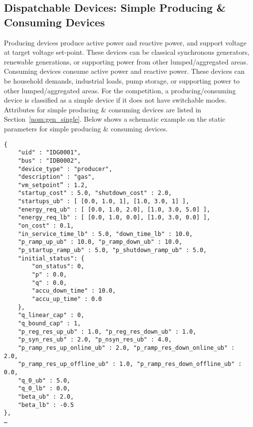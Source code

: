 \subsection{Dispatchable Devices: Simple Producing \& Consuming Devices}
\label{sec:generator}
Producing devices
produce active power and reactive power, and support voltage at target voltage set-point.
These devices can be classical synchronous generators, renewable generations, or supporting 
power from other lumped/aggregated areas. 
Consuming devices consume active power and reactive power.
These devices can be household demands, industrial loads, pump storage, or
supporting power to other lumped/aggregated areas. 
For the competition, a producing/consuming device is classified as a simple device if it
does not have switchable modes.
Attributes for simple producing \& consuming devices are listed in Section~\ref{nom:gen_single}.
Below shows a schematic example on the static parameters for simple producing \& consuming devices.

\begin{verbatim}
{
    "uid" : "IDG0001",
    "bus" : "IDB0002",
    "device_type" : "producer",
    "description" : "gas",
    "vm_setpoint” : 1.2,
    "startup_cost" : 5.0, "shutdown_cost" : 2.0,
    "startups_ub" : [ [0.0, 1.0, 1], [1.0, 3.0, 1] ],
    "energy_req_ub" : [ [0.0, 1.0, 2.0], [1.0, 3.0, 5.0] ],
    "energy_req_lb" : [ [0.0, 1.0, 0.0], [1.0, 3.0, 0.0] ],
    "on_cost" : 0.1,
    "in_service_time_lb" : 5.0, "down_time_lb" : 10.0,
    "p_ramp_up_ub" : 10.0, "p_ramp_down_ub" : 10.0, 
    "p_startup_ramp_ub" : 5.0, "p_shutdown_ramp_ub" : 5.0,
    "initial_status": {
        "on_status": 0,
        "p" : 0.0,
        "q" : 0.0,
        "accu_down_time" : 10.0,
        "accu_up_time" : 0.0
    },
    "q_linear_cap" : 0, 
    "q_bound_cap" : 1, 
    "p_reg_res_up_ub" : 1.0, "p_reg_res_down_ub" : 1.0,
    "p_syn_res_ub" : 2.0, "p_nsyn_res_ub" : 4.0, 
    "p_ramp_res_up_online_ub" : 2.0, "p_ramp_res_down_online_ub" : 2.0,
    "p_ramp_res_up_offline_ub" : 1.0, "p_ramp_res_down_offline_ub" : 0.0,
    "q_0_ub" : 5.0,
    "q_0_lb" : 0.0,
    "beta_ub" : 2.0,
    "beta_lb" : -0.5    
},
…     
\end{verbatim}



